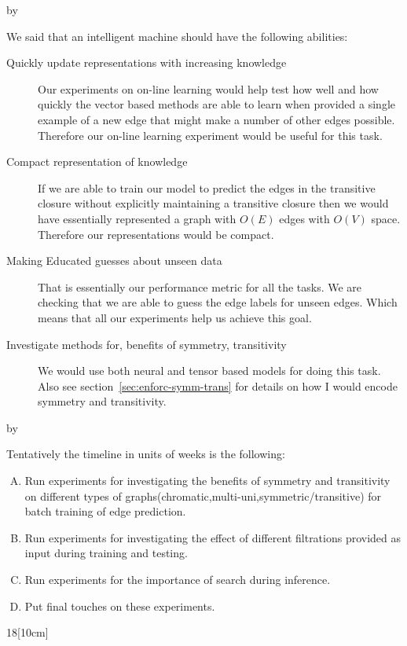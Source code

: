 \documentclass[12pt,answers]{exam} %
\makeatletter
\def\SetTotalwidth{\advance\linewidth by \@totalleftmargin
\@totalleftmargin=0pt}
\newcommand{\answer}[1]{
\ifprintanswers
\SetTotalwidth
  \begin{solution}[0in]#1\end{solution}
\else \fi
}
\makeatother
\begin{document}
\begin{questions}
\answer{We said that an intelligent machine should have the following
  abilities:
  \begin{description}
  \item[Quickly update representations with increasing knowledge] Our
    experiments on on-line learning would help test how well and how
    quickly the vector based methods are able to learn when provided a
    single example of a new edge that might make a number of other
    edges possible. Therefore our on-line learning experiment would be
    useful for this task.
  \item [Compact representation of knowledge] If we are able to train
  our model to predict the edges in the transitive closure without
  explicitly maintaining a transitive closure then we would have
  essentially represented a graph with $O(E)$ edges with $O(V)$
  space. Therefore our representations would be compact.
\item [Making Educated guesses about unseen data] That is essentially
  our performance metric for all the tasks. We are checking that we
  are able to guess the edge labels for unseen edges. Which means that
  all our experiments help us achieve this goal.
\item [Investigate methods for, benefits of symmetry, transitivity]
  We would use both neural and tensor based models for doing this
  task. Also see section~\ref{sec:enforc-symm-trans} for details on how I would
  encode symmetry and transitivity.
  \end{description}
}

\answer{
  Tentatively the timeline in units of weeks is the following:
  \begin{enumerate}[A)]
  \item Run experiments for investigating the benefits of symmetry and
    transitivity on different types of
    graphs(chromatic,multi-uni,symmetric/transitive) for batch
    training of edge prediction.
  \item Run experiments for investigating the effect of different
    filtrations provided as input during training and testing.
  \item Run experiments for the importance of search during inference.
  \item Put final touches on these experiments.
  \end{enumerate}
  \begin{chronology}[1]{1}{8}{\textwidth}[10cm]
    \event{2}{\large{A}}
    \event{4}{\large{B}}
    \event{6}{\large{C}}
    \event{8}{\large{D}}
  \end{chronology}
}


\end{questions}
\end{document}
